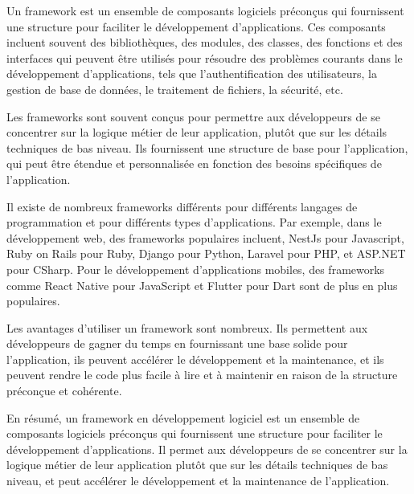 Un framework est un ensemble de composants logiciels préconçus qui fournissent une structure pour faciliter le développement d'applications. Ces composants incluent souvent des bibliothèques, des modules, des classes, des fonctions et des interfaces qui peuvent être utilisés pour résoudre des problèmes courants dans le développement d'applications, tels que l'authentification des utilisateurs, la gestion de base de données, le traitement de fichiers, la sécurité, etc.

Les frameworks sont souvent conçus pour permettre aux développeurs de se concentrer sur la logique métier de leur application, plutôt que sur les détails techniques de bas niveau. Ils fournissent une structure de base pour l'application, qui peut être étendue et personnalisée en fonction des besoins spécifiques de l'application.

Il existe de nombreux frameworks différents pour différents langages de programmation et pour différents types d'applications. Par exemple, dans le développement web, des frameworks populaires incluent, NestJs pour Javascript, Ruby on Rails pour Ruby, Django pour Python, Laravel pour PHP, et ASP.NET pour CSharp. Pour le développement d'applications mobiles, des frameworks comme React Native pour JavaScript et Flutter pour Dart sont de plus en plus populaires.

Les avantages d'utiliser un framework sont nombreux. Ils permettent aux développeurs de gagner du temps en fournissant une base solide pour l'application, ils peuvent accélérer le développement et la maintenance, et ils peuvent rendre le code plus facile à lire et à maintenir en raison de la structure préconçue et cohérente.

En résumé, un framework en développement logiciel est un ensemble de composants logiciels préconçus qui fournissent une structure pour faciliter le développement d'applications. Il permet aux développeurs de se concentrer sur la logique métier de leur application plutôt que sur les détails techniques de bas niveau, et peut accélérer le développement et la maintenance de l'application.